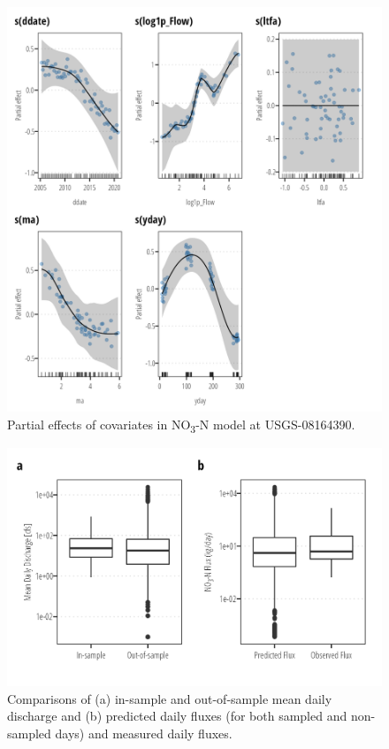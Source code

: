 \documentclass[
]{article}
\begin{document}
\begin{figure}[h]

{\centering \includegraphics{model_assessment_files/figure-pdf/unnamed-chunk-17-1.png}

}

\caption{Partial effects of covariates in NO\textsubscript{3}-N model at
USGS-08164390.}

\end{figure}

\begin{figure}[h]

{\centering \includegraphics{model_assessment_files/figure-pdf/unnamed-chunk-18-1.png}

}

\caption{Comparisons of (a) in-sample and out-of-sample mean daily
discharge and (b) predicted daily fluxes (for both sampled and
non-sampled days) and measured daily fluxes.}

\end{figure}
\end{document}
